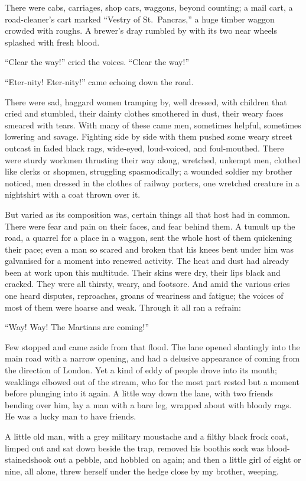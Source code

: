 There were cabs, carriages, shop cars, waggons, beyond counting; a
mail cart, a road-cleaner's cart marked ``Vestry of St.\ Pancras,'' a
huge timber waggon crowded with roughs. A brewer's dray rumbled by
with its two near wheels splashed with fresh blood.

``Clear the way!'' cried the voices. ``Clear the way!''

``Eter-nity! Eter-nity!'' came echoing down the road.

There were sad, haggard women tramping by, well dressed, with
children that cried and stumbled, their dainty clothes smothered in
dust, their weary faces smeared with tears. With many of these came
men, sometimes helpful, sometimes lowering and savage. Fighting
side by side with them pushed some weary street outcast in faded
black rags, wide-eyed, loud-voiced, and foul-mouthed. There were
sturdy workmen thrusting their way along, wretched, unkempt men,
clothed like clerks or shopmen, struggling spasmodically; a wounded
soldier my brother noticed, men dressed in the clothes of railway
porters, one wretched creature in a nightshirt with a coat thrown
over it.

But varied as its composition was, certain things all that host had
in common. There were fear and pain on their faces, and fear behind
them. A tumult up the road, a quarrel for a place in a waggon, sent
the whole host of them quickening their pace; even a man so scared
and broken that his knees bent under him was galvanised for a
moment into renewed activity. The heat and dust had already been at
work upon this multitude. Their skins were dry, their lips black
and cracked. They were all thirsty, weary, and footsore. And amid
the various cries one heard disputes, reproaches, groans of
weariness and fatigue; the voices of most of them were hoarse and
weak. Through it all ran a refrain:

``Way! Way! The Martians are coming!''

Few stopped and came aside from that flood. The lane opened
slantingly into the main road with a narrow opening, and had a
delusive appearance of coming from the direction of London. Yet a
kind of eddy of people drove into its mouth; weaklings elbowed out
of the stream, who for the most part rested but a moment before
plunging into it again. A little way down the lane, with two
friends bending over him, lay a man with a bare leg, wrapped about
with bloody rags. He was a lucky man to have friends.

A little old man, with a grey military moustache and a filthy black
frock coat, limped out and sat down beside the trap, removed his
boot\dash{}his sock was blood-stained\dash{}shook out a pebble, and hobbled
on again; and then a little girl of eight or nine, all alone, threw
herself under the hedge close by my brother, weeping.

